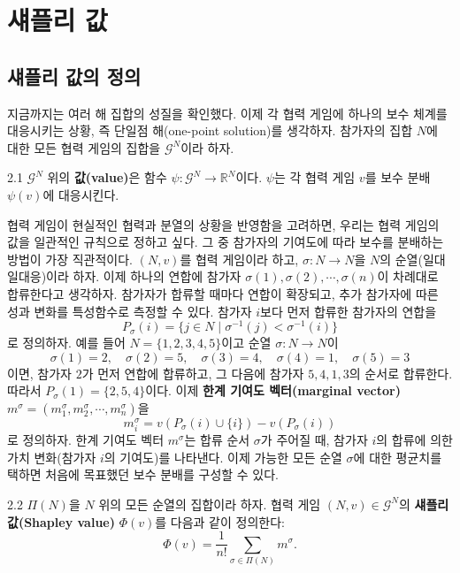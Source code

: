 \documentclass{article}
\numberwithin{equation}{section}
\begin{document}
\section{섀플리 값}

\subsection{섀플리 값의 정의}
지금까지는 여러 해 집합의 성질을 확인했다. 이제 각 협력 게임에 하나의 보수 체계를 대응시키는 상황, 즉 단일점 해(one-point solution)를 생각하자. 참가자의 집합 $N$에 대한 모든 협력 게임의 집합을 $\mathcal G^N$이라 하자.

\begin{dfn}{}{2.1}
	$\mathcal G^N$ 위의 \textbf{값(value)}은 함수 $\psi:\mathcal G^N\to\mathbb R^N$이다. $\psi$는 각 협력 게임 $v$를 보수 분배 $\psi(v)$에 대응시킨다.
\end{dfn}

협력 게임이 현실적인 협력과 분열의 상황을 반영함을 고려하면, 우리는 협력 게임의 값을 일관적인 규칙으로 정하고 싶다. 그 중 참가자의 기여도에 따라 보수를 분배하는 방법이 가장 직관적이다. $(N,v)$를 협력 게임이라 하고, $\sigma:N\to N$을 $N$의 순열(일대일대응)이라 하자. 이제 하나의 연합에 참가자 $\sigma(1),\sigma(2),\cdots,\sigma(n)$이 차례대로 합류한다고 생각하자. 참가자가 합류할 때마다 연합이 확장되고, 추가 참가자에 따른 성과 변화를 특성함수로 측정할 수 있다. 참가자 $i$보다 먼저 합류한 참가자의 연합을
\[
	P_\sigma(i)=\{j\in N\mid\sigma^{-1}(j)<\sigma^{-1}(i)\}
\]
로 정의하자. 예를 들어 $N=\{1,2,3,4,5\}$이고 순열 $\sigma:N\to N$이
\[
	\sigma(1)=2,\quad\sigma(2)=5,\quad\sigma(3)=4,\quad\sigma(4)=1,\quad\sigma(5)=3
\]
이면, 참가자 $2$가 먼저 연합에 합류하고, 그 다음에 참가자 $5,4,1,3$의 순서로 합류한다. 따라서 $P_\sigma(1)=\{2,5,4\}$이다. 이제 \textbf{한계 기여도 벡터(marginal vector)} $m^\sigma=(m^\sigma_1,m^\sigma_2,\cdots,m^\sigma_n)$을
\begin{equation}
	\label{eq:2.1}
	m^\sigma_i=v(P_\sigma(i)\cup\{i\})-v(P_\sigma(i))
\end{equation}
로 정의하자. 한계 기여도 벡터 $m^\sigma$는 합류 순서 $\sigma$가 주어질 때, 참가자 $i$의 합류에 의한 가치 변화(참가자 $i$의 기여도)를 나타낸다. 이제 가능한 모든 순열 $\sigma$에 대한 평균치를 택하면 처음에 목표했던 보수 분배를 구성할 수 있다.

\begin{dfn}{}{2.2}
	$\Pi(N)$을 $N$ 위의 모든 순열의 집합이라 하자. 협력 게임 $(N,v)\in\mathcal G^N$의 \textbf{섀플리 값(Shapley value)} $\Phi(v)$를 다음과 같이 정의한다:
	\[
		\Phi(v)=\frac{1}{n!}\sum_{\sigma\in\Pi(N)}m^\sigma.
	\]
\end{dfn}
\end{document}
